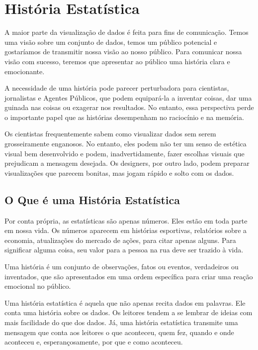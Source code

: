 \chapter{História Estatística}

A maior parte da visualização de dados é feita para fins de comunicação. Temos uma visão sobre um conjunto de dados, temos um público potencial e gostaríamos de transmitir nossa visão ao nosso público. Para comunicar nossa visão com sucesso, teremos que apresentar ao público uma história clara e emocionante. \vskip0.3cm

A necessidade de uma história pode parecer perturbadora para cientistas, jornalistas e Agentes Públicos, que podem equipará-la a inventar coisas, dar uma guinada nas coisas ou exagerar nos resultados. No entanto, essa perspectiva perde o importante papel que as histórias desempenham no raciocínio e na memória.\vskip0.3cm

Os cientistas frequentemente sabem como visualizar dados sem serem grosseiramente enganosos. No entanto, eles podem não ter um senso de estética visual bem desenvolvido e podem, inadvertidamente, fazer escolhas visuais que prejudicam a mensagem desejada. Os designers, por outro lado, podem preparar visualizações que parecem bonitas, mas jogam rápido e solto com os dados. 

\section{O Que é uma História Estatística}

Por conta própria, as estatísticas são apenas números. Eles estão em toda parte em nossa vida. Os números aparecem em histórias esportivas, relatórios sobre a economia, atualizações do mercado de ações, para citar apenas alguns. Para significar alguma coisa, seu valor para a pessoa na rua deve ser trazido à vida.\vskip0.3cm 

Uma história é um conjunto de observações, fatos ou eventos, verdadeiros ou inventados, que são apresentados em uma ordem específica para criar uma reação emocional no público.\vskip0.3cm 

Uma história estatística é aquela que não apenas recita dados em palavras. Ele conta uma história sobre os dados. Os leitores tendem a se lembrar de ideias com mais facilidade do que dos dados. Já, uma história estatística transmite uma mensagem que conta aos leitores o que aconteceu, quem fez, quando e onde aconteceu e, esperançosamente, por que e como aconteceu.\vskip0.3cm 

